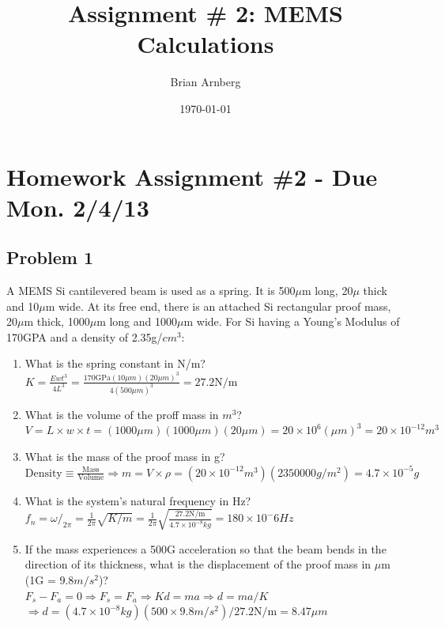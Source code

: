 \documentclass{article}
\title{Assignment \# 2: MEMS Calculations}
\date{\today}
\author{Brian Arnberg}
\begin{document}
\label{start}



\section*{ Homework Assignment \#2 - Due Mon. 2/4/13 }
\subsection*{ Problem 1 }
A MEMS Si cantilevered beam is used as a spring. It is 500$\mu$m long, 20$\mu$ thick
   and 10$\mu$m wide. At its free end, there is an attached Si rectangular proof mass,
   20$\mu$m thick, 1000$\mu$m long and 1000$\mu$m wide. For Si having a Young's Modulus
   of 170GPA and a density of 2.35g/$cm^3$:
\begin{enumerate}
	\item What is the spring constant in N/m?\\
	$ K = \frac{E w t^3}{4 L^3} = 
		\frac{170 \text{GPa} (10\mu m) (20\mu m)^3}{4(500\mu m)^3} = 
		27.2 \text{N/m} $ 
	\item What is the volume of the proff mass in $m^3$?\\
		$ V = L \times w \times t =
		(1000\mu m)(1000\mu m)(20\mu m) =
		20 \times 10^6 (\mu m)^3 =
		20 \times 10^{-12} m^3 $
	\item What is the mass of the proof mass in g?\\
		$ \text{Density} \equiv \frac{\text{Mass}}{\text{Volume}} 
		\Rightarrow m = V \times \rho = (20 \times 10^{-12} m^3)(2350000 g/m^2)
		= 4.7 \times 10^{-5} g$
	\item What is the system's natural frequency in Hz?\\
		$ f_n = \omega/_{2\pi} = \frac{1}{2\pi}\sqrt{K/m} 
		= \frac{1}{2\pi}\sqrt{\frac{27.2 \text{N/m}}{4.7 \times 10^{-8} kg}}
		= 180 \times 10^-6 Hz $ 
	\item If the mass experiences a 500G acceleration so that the beam bends in the
       direction of its thickness, what is the displacement of the proof mass in $\mu$m
       (1G = $9.8m/s^2$)?\\
       		$ F_s - F_a = 0 \Rightarrow F_s = F_a \Rightarrow K d = m a \Rightarrow d = m a / K$\\$
		\Rightarrow d = (4.7\times10^{-8} kg )(500 \times 9.8 m/s^2)/ 27.2 \text{N/m}
		= 8.47 \mu m$
\end{enumerate}
\end{document}
